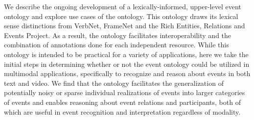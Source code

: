 We describe the ongoing development of a lexically-informed, upper-level event ontology and explore use cases of the ontology.  This ontology draws its lexical sense distinctions from VerbNet, FrameNet and the Rich Entities, Relations and Events Project.  As a result, the ontology facilitates interoperability and the combination of annotations done for each independent resource.  While this ontology is intended to be practical for a variety of applications, here we take the initial steps in determining whether or not the event ontology could be utilized in multimodal applications, specifically to recognize and reason about events in both text and video.  We find that the ontology facilitates the generalization of potentially noisy or sparse individual realizations of events into larger categories of events and enables reasoning about event relations and participants, both of which are useful in event recognition and interpretation regardless of modality.
